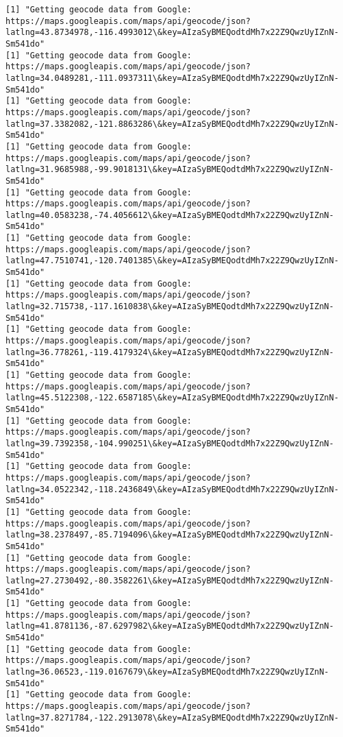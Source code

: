 \documentclass[11pt]{article}
\begin{document}
\begin{Verbatim}[commandchars=\\\{\}]
[1] "Getting geocode data from Google: https://maps.googleapis.com/maps/api/geocode/json?latlng=43.8734978,-116.4993012\&key=AIzaSyBMEQodtdMh7x22Z9QwzUyIZnN-Sm541do"
[1] "Getting geocode data from Google: https://maps.googleapis.com/maps/api/geocode/json?latlng=34.0489281,-111.0937311\&key=AIzaSyBMEQodtdMh7x22Z9QwzUyIZnN-Sm541do"
[1] "Getting geocode data from Google: https://maps.googleapis.com/maps/api/geocode/json?latlng=37.3382082,-121.8863286\&key=AIzaSyBMEQodtdMh7x22Z9QwzUyIZnN-Sm541do"
[1] "Getting geocode data from Google: https://maps.googleapis.com/maps/api/geocode/json?latlng=31.9685988,-99.9018131\&key=AIzaSyBMEQodtdMh7x22Z9QwzUyIZnN-Sm541do"
[1] "Getting geocode data from Google: https://maps.googleapis.com/maps/api/geocode/json?latlng=40.0583238,-74.4056612\&key=AIzaSyBMEQodtdMh7x22Z9QwzUyIZnN-Sm541do"
[1] "Getting geocode data from Google: https://maps.googleapis.com/maps/api/geocode/json?latlng=47.7510741,-120.7401385\&key=AIzaSyBMEQodtdMh7x22Z9QwzUyIZnN-Sm541do"
[1] "Getting geocode data from Google: https://maps.googleapis.com/maps/api/geocode/json?latlng=32.715738,-117.1610838\&key=AIzaSyBMEQodtdMh7x22Z9QwzUyIZnN-Sm541do"
[1] "Getting geocode data from Google: https://maps.googleapis.com/maps/api/geocode/json?latlng=36.778261,-119.4179324\&key=AIzaSyBMEQodtdMh7x22Z9QwzUyIZnN-Sm541do"
[1] "Getting geocode data from Google: https://maps.googleapis.com/maps/api/geocode/json?latlng=45.5122308,-122.6587185\&key=AIzaSyBMEQodtdMh7x22Z9QwzUyIZnN-Sm541do"
[1] "Getting geocode data from Google: https://maps.googleapis.com/maps/api/geocode/json?latlng=39.7392358,-104.990251\&key=AIzaSyBMEQodtdMh7x22Z9QwzUyIZnN-Sm541do"
[1] "Getting geocode data from Google: https://maps.googleapis.com/maps/api/geocode/json?latlng=34.0522342,-118.2436849\&key=AIzaSyBMEQodtdMh7x22Z9QwzUyIZnN-Sm541do"
[1] "Getting geocode data from Google: https://maps.googleapis.com/maps/api/geocode/json?latlng=38.2378497,-85.7194096\&key=AIzaSyBMEQodtdMh7x22Z9QwzUyIZnN-Sm541do"
[1] "Getting geocode data from Google: https://maps.googleapis.com/maps/api/geocode/json?latlng=27.2730492,-80.3582261\&key=AIzaSyBMEQodtdMh7x22Z9QwzUyIZnN-Sm541do"
[1] "Getting geocode data from Google: https://maps.googleapis.com/maps/api/geocode/json?latlng=41.8781136,-87.6297982\&key=AIzaSyBMEQodtdMh7x22Z9QwzUyIZnN-Sm541do"
[1] "Getting geocode data from Google: https://maps.googleapis.com/maps/api/geocode/json?latlng=36.06523,-119.0167679\&key=AIzaSyBMEQodtdMh7x22Z9QwzUyIZnN-Sm541do"
[1] "Getting geocode data from Google: https://maps.googleapis.com/maps/api/geocode/json?latlng=37.8271784,-122.2913078\&key=AIzaSyBMEQodtdMh7x22Z9QwzUyIZnN-Sm541do"

\end{Verbatim}
\end{document}
